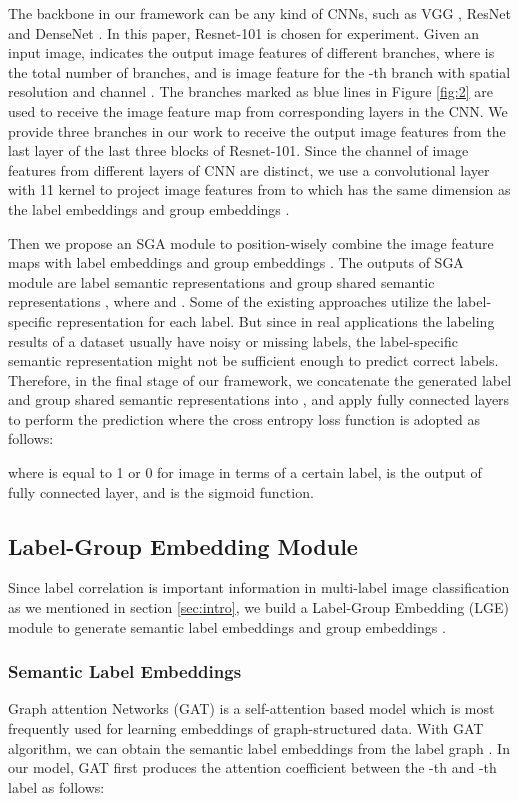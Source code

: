 \documentclass{article} \usepackage{nips14submit_e,times}
\begin{document}
The backbone in our framework can be any kind of CNNs,
such as VGG \cite{Vgg}, ResNet \cite{ResNet} and DenseNet \cite{DenseNet}.
In this paper, Resnet-101 is chosen for experiment.
Given an input image,  indicates the output image features of different branches,
where  is the total number of branches, and 
is image feature for the -th branch with spatial resolution  and channel .
The branches marked as blue lines in Figure \ref{fig:2}
are used to receive the image feature map  from corresponding layers in the CNN.
We provide three branches in our work to receive the output image features from the last layer of the last three blocks of Resnet-101.
Since the channel  of image features from different layers of CNN are distinct,
we use a convolutional layer with 11  kernel to project image features from
 to 
which has the same dimension  as the label embeddings  and group embeddings .


Then we propose an SGA module to position-wisely combine
the image feature maps  with
label embeddings  and group embeddings .
The outputs of SGA module are label semantic representations 
and group shared semantic representations ,
where  and .
Some of the existing approaches utilize the label-specific representation for each label. But since in real applications the labeling results of a dataset usually have noisy or missing labels, the label-specific semantic representation might not be sufficient enough to predict correct labels. Therefore, in the final stage of our framework,
we concatenate the generated label and group shared semantic representations into , and apply fully connected layers to perform the prediction where the cross entropy loss function is adopted as follows:

where  is equal to 1 or 0 for image  in terms of a certain label,  is the output of fully connected layer, and  is the sigmoid function.


\subsection{Label-Group Embedding Module}
Since label correlation is important information in multi-label
image classification as we mentioned in section \ref{sec:intro},
we build a Label-Group Embedding (LGE) module to generate semantic label embeddings  and group embeddings .

\subsubsection{Semantic Label Embeddings}
Graph attention Networks (GAT) \cite{ICLR2018:GAT} is a self-attention based model which is most frequently used for learning embeddings of graph-structured data.
With GAT algorithm, we can obtain the semantic label embeddings  from the label graph .
In our model, GAT first produces the attention coefficient  between the -th and -th label as follows:
\end{document}
